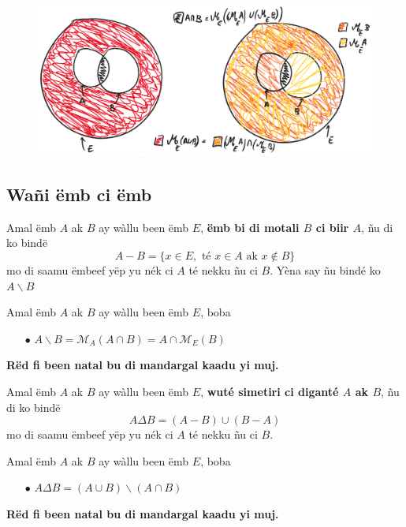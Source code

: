 \documentclass[twoside, a4paper]{article}
\begin{document}
\begin{figure}[ht]
    \centering
    \includegraphics[scale = 0.5]{image/motali_emb_teg.png}
    \label{fig:motali_emb_teg}
\end{figure}

\subsection{Wañi ëmb ci ëmb}
\begin{tcolorbox}[enhanced jigsaw,breakable,pad at break*=1mm, colback=red!5!white,colframe=white!75!black,title= Téeki,watermark color=white]
Amal ëmb $A$ ak $B$ ay wàllu been ëmb $E$, \textbf{ëmb bi di motali $B$ ci biir $A$}, ñu di ko bindë $$A - B = \big \{x \in E, \text{ té } x \in A \text{ ak } x \not \in B\}$$
mo di saamu ëmbeef yëp yu nék ci $A$ té nekku ñu ci $B$. Yèna say ñu bindé ko $A \backslash B$ 
\end{tcolorbox}

\begin{tcolorbox}[enhanced jigsaw,breakable,pad at break*=1mm, colback=orange!5!white,colframe=white!75!black,title= Seetlu,
  watermark color=white]
Amal ëmb $A$ ak $B$ ay wàllu been ëmb $E$, boba
\begin{itemize}
    \item[$\bullet$] $A\backslash B = \mathcal{M}_A (A\cap B) = A \cap \mathcal{M}_E (B)$
\end{itemize}
\end{tcolorbox}
\textbf{Rëd fi been natal bu di mandargal kaadu yi muj.}

\begin{tcolorbox}[enhanced jigsaw,breakable,pad at break*=1mm, colback=red!5!white,colframe=white!75!black,title= Téeki,watermark color=white]
  Amal ëmb $A$ ak $B$ ay wàllu been ëmb $E$, \textbf{wuté simetiri ci diganté $A$ ak $B$}, ñu di ko bindë $$A \Delta  B = (A-B) \cup (B-A)$$
  mo di saamu ëmbeef yëp yu nék ci $A$ té nekku ñu ci $B$.
\end{tcolorbox}
  
\begin{tcolorbox}[enhanced jigsaw,breakable,pad at break*=1mm, colback=orange!5!white,colframe=white!75!black,title= Seetlu,
  watermark color=white]
Amal ëmb $A$ ak $B$ ay wàllu been ëmb $E$, boba
\begin{itemize}
    \item[$\bullet$] $A \Delta  B = (A \cup B) \backslash (A \cap B)$
\end{itemize}
\end{tcolorbox}
\textbf{Rëd fi been natal bu di mandargal kaadu yi muj.}
\end{document}
